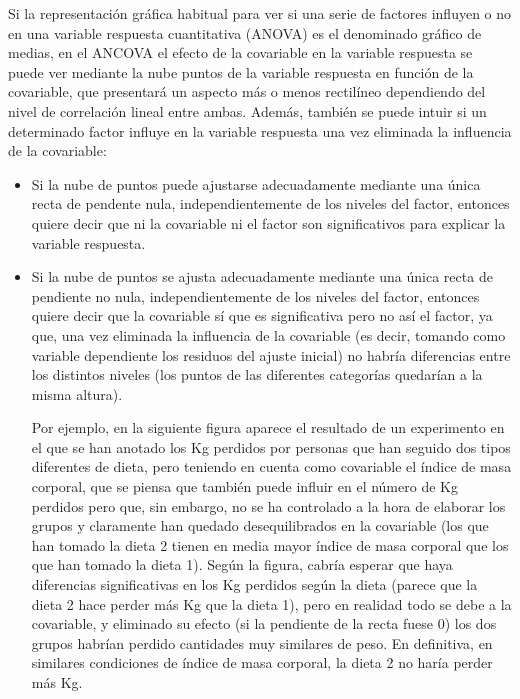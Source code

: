 \documentclass[
  a4paper,
]{scrreport}
\theoremstyle{plain}
\theoremstyle{definition}
\theoremstyle{definition}
\theoremstyle{remark}
\begin{document}
Si la representación gráfica habitual para ver si una serie de factores
influyen o no en una variable respuesta cuantitativa (ANOVA) es el
denominado gráfico de medias, en el ANCOVA el efecto de la covariable en
la variable respuesta se puede ver mediante la nube puntos de la
variable respuesta en función de la covariable, que presentará un
aspecto más o menos rectilíneo dependiendo del nivel de correlación
lineal entre ambas. Además, también se puede intuir si un determinado
factor influye en la variable respuesta una vez eliminada la influencia
de la covariable:

\begin{itemize}
\item
  Si la nube de puntos puede ajustarse adecuadamente mediante una única
  recta de pendente nula, independientemente de los niveles del factor,
  entonces quiere decir que ni la covariable ni el factor son
  significativos para explicar la variable respuesta.
\item
  Si la nube de puntos se ajusta adecuadamente mediante una única recta
  de pendiente no nula, independientemente de los niveles del factor,
  entonces quiere decir que la covariable sí que es significativa pero
  no así el factor, ya que, una vez eliminada la influencia de la
  covariable (es decir, tomando como variable dependiente los residuos
  del ajuste inicial) no habría diferencias entre los distintos niveles
  (los puntos de las diferentes categorías quedarían a la misma altura).

  Por ejemplo, en la siguiente figura aparece el resultado de un
  experimento en el que se han anotado los Kg perdidos por personas que
  han seguido dos tipos diferentes de dieta, pero teniendo en cuenta
  como covariable el índice de masa corporal, que se piensa que también
  puede influir en el número de Kg perdidos pero que, sin embargo, no se
  ha controlado a la hora de elaborar los grupos y claramente han
  quedado desequilibrados en la covariable (los que han tomado la dieta
  2 tienen en media mayor índice de masa corporal que los que han tomado
  la dieta 1). Según la figura, cabría esperar que haya diferencias
  significativas en los Kg perdidos según la dieta (parece que la dieta
  2 hace perder más Kg que la dieta 1), pero en realidad todo se debe a
  la covariable, y eliminado su efecto (si la pendiente de la recta
  fuese 0) los dos grupos habrían perdido cantidades muy similares de
  peso. En definitiva, en similares condiciones de índice de masa
  corporal, la dieta 2 no haría perder más Kg.


\end{itemize}
\end{document}
